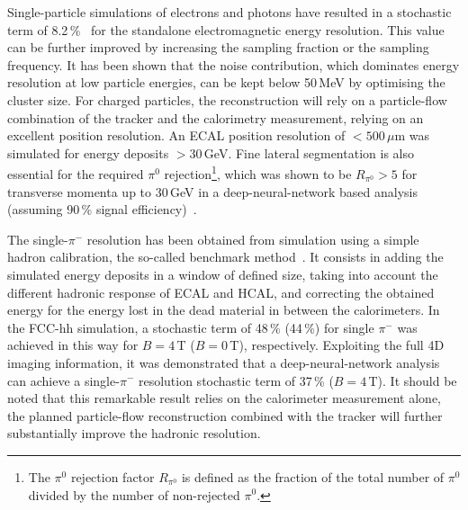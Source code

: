 Single-particle simulations of electrons and photons have resulted in a stochastic term of 8.2\,\%~\cite{aleksa2019calorimeters,Aleksa:2020qdy} for the standalone electromagnetic energy resolution. This value can be further improved by increasing the sampling fraction or the sampling frequency. It has been shown that the noise contribution, which dominates energy resolution at low particle energies, can be kept below 50\,MeV by optimising the cluster size. For charged particles, the reconstruction will rely on a particle-flow combination of the tracker and the calorimetry measurement, relying on an excellent position resolution. An ECAL position resolution of $<500\,\mu\mathrm{m}$ was simulated for energy deposits $>30$\,GeV. Fine lateral segmentation is also essential for the required $\pi^0$ rejection\footnote{The $\pi^0$ rejection factor $R_{\pi^0}$ is defined as the fraction of the total number of $\pi^0$ divided by the number of non-rejected $\pi^0$.}, which was shown to be $R_{\pi^0}>5$ for transverse momenta up to $30$\,GeV in a deep-neural-network based analysis (assuming 90\,\% signal efficiency)~\cite{aleksa2019calorimeters}.

The single-$\pi^-$ resolution has been obtained from simulation using a simple hadron calibration, the so-called benchmark method~\cite{aleksa2019calorimeters}. It consists in adding the simulated energy deposits in a window of defined size, taking into account the different hadronic response of ECAL and HCAL, and correcting the obtained energy for the energy lost in the dead material in between the calorimeters. In the FCC-hh simulation, a stochastic term of 48\,\% (44\,\%) for single $\pi^-$ was achieved in this way for $B=4$\,T ($B=0$\,T), respectively. Exploiting the full 4D imaging information, it was demonstrated that a deep-neural-network analysis can achieve a single-$\pi^-$ resolution stochastic term of 37\,\% ($B=4$\,T). It should be noted that this remarkable result relies on the calorimeter measurement alone, the planned particle-flow reconstruction combined with the tracker will further substantially improve the hadronic resolution.
